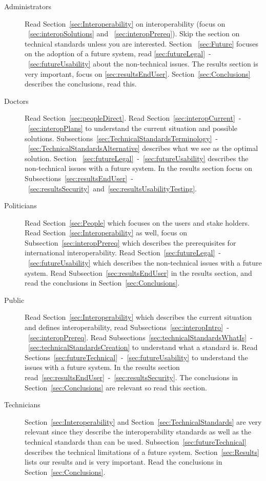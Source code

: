 \documentclass[14pt]{article}
\begin{document}
\begin{description}
\item[Administrators] Read Section~\ref{sec:Interoperability} on interoperability (focus on ~\ref{sec:interopSolutions} and ~\ref{sec:interopPrereq}). Skip the section on technical standards unless you are interested. Section ~\ref{sec:Future} focuses on the adoption of a future system, read \ref{sec:futureLegal}~-~\ref{sec:futureUsability} about the non-technical issues. The results section is very important, focus on \ref{sec:resultsEndUser}. Section~\ref{sec:Conclusions} describes the conclusions, read this.
\item[Doctors] Read Section~\ref{sec:peopleDirect}. Read Section~\ref{sec:interopCurrent}~-~\ref{sec:interopPlans} to understand the current situation and possible solutions. Subsections~\ref{sec:TechnicalStandardsTerminology}~-~\ref{sec:TechnicalStandardsAlternative} describes what we see as the optimal solution. Section ~\ref{sec:futureLegal}~-~\ref{sec:futureUsability} describes the non-technical issues with a future system. In the results section focus on Subsections~\ref{sec:resultsEndUser}~-~\ref{sec:resultsSecurity}~and~\ref{sec:resultsUsabilityTesting}.
\item[Politicians] Read Section~\ref{sec:People} which focuses on the users and stake holders. Read Section~\ref{sec:Interoperability} as well, focus on Subsection~\ref{sec:interopPrereq} which describes the prerequisites for international interoperability. Read Section~\ref{sec:futureLegal}~-~\ref{sec:futureUsability} which describes the non-technical issues with a future system. Read Subsection~\ref{sec:resultsEndUser} in the results section, and read the conclusions in Section~\ref{sec:Conclusions}.
\item[Public] Read Section~\ref{sec:Interoperability} which describes the current situation and defines interoperability, read Subsections~\ref{sec:interopIntro}~-~\ref{sec:interopPrereq}. Read Subsections~\ref{sec:technicalStandardsWhatIs}~-~\ref{sec:technicalStandardsCreation} to understand what a standard is. Read Sections~\ref{sec:futureTechnical}~-~\ref{sec:futureUsability} to understand the issues with a future system. In the results section read~\ref{sec:resultsEndUser}~-~\ref{sec:resultsSecurity}. The conclusions in Section~\ref{sec:Conclusions} are relevant so read this section.
\item[Technicians] Section~\ref{sec:Interoperability} and Section~\ref{sec:TechnicalStandards} are very relevant since they describe the interoperability standards as well as the technical standards than can be used. Subsection~\ref{sec:futureTechnical} describes the technical limitations of a future system. Section~\ref{sec:Results} lists our results and is very important. Read the conclusions in Section~\ref{sec:Conclusions}.
\end{description}
\end{document}
